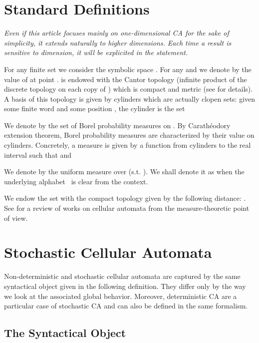 \documentclass[submission]{fundam}
\begin{document}
\section{Standard Definitions}
\label{sec:basic}

\textit{Even if this article focuses mainly on one-dimensional CA for the sake of simplicity, it extends naturally to higher dimensions. Each time a result is sensitive to dimension, it will be explicited in the statement.}
\newcommand\extendstoalldimensions{\textit{The proof is written for 1D CA to simplify notations but it extends to any dimension in a straighforward way.}}
 

For any finite set  we consider the symbolic space . For any  and  we denote by  the value of  at point .  is endowed with the Cantor topology (infinite product of the discrete topology on each copy of ) which is compact and metric (see \cite{kurkabook} for details). A basis of this topology is given by cylinders which are actually clopen sets: given some finite word  and some position , the cylinder  is the set


We denote by  the set of Borel probability measures on . By Carath\'eodory extension theorem, Borel probability measures are characterized by their value on cylinders. Concretely, a measure is given by a function  from cylinders to the real interval  such that  and


We denote by  the uniform measure over  (s.t. ). We shall denote it as  when the underlying alphabet~ is clear from the context. 

We endow the set  with the compact topology given by the following distance:
.
See \cite{Pivato09} for a review of works on cellular automata from the measure-theoretic point of view.

\section{Stochastic Cellular Automata}
\label{sec:SCA}

Non-deterministic and stochastic cellular automata are captured by the same syntactical object given in the following definition. They differ only by the way we look at the associated global behavior. Moreover, deterministic CA are a particular case of stochastic CA and can also be defined in the same formalism.

\subsection{The Syntactical Object}
\end{document}
